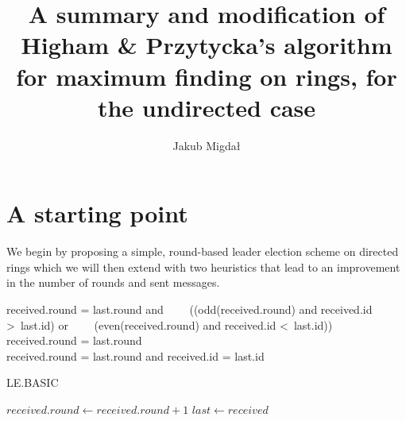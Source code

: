 \documentclass{article}
\title{A summary and modification of Higham \& Przytycka's algorithm for maximum finding on rings, for the undirected case}
\author{Jakub Migdał}
\date{}
\begin{document}
\maketitle

\section{A starting point}
We begin by proposing a simple, round-based leader election scheme on directed rings which we will then extend with two heuristics that lead to an improvement in the number of rounds and sent messages.
\\
\begin{algorithmic}
    \State \Return received.round = last.round and
    \State \ \ \ \ ((odd(received.round) and received.id \textgreater \ last.id) or
    \State \ \ \ \  (even(received.round) and received.id \textless   \ last.id))
\EndFunction
\\

    \State \Return received.round = last.round
\EndFunction
\\

    \State \Return received.round = last.round and received.id = last.id
\EndFunction
\\
\end{algorithmic}

\begin{algorithm}[H]
\caption{LE.BASIC}
\begin{algorithmic}
\Repeat
            \State $received.round \gets received.round+1$
        \EndIf
        \State $last \gets received$
        \State {}
    \EndIf
\Until {}
\end{algorithmic}
\end{algorithm}
\end{document}
